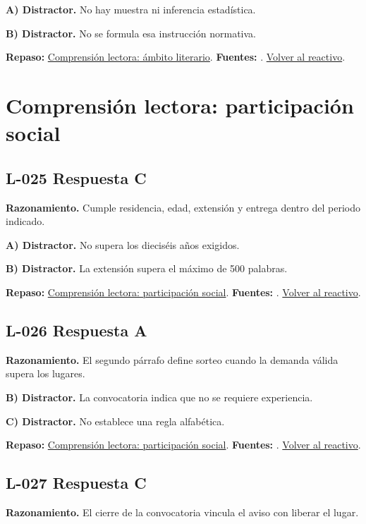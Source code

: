 \textbf{A) Distractor. }No hay muestra ni inferencia estadística.

\textbf{B) Distractor. }No se formula esa instrucción normativa.

\textbf{Repaso:} \hyperref[sec:l2]{Comprensión lectora: ámbito literario}. \textbf{Fuentes:} \cite{ceneval,reading}. \hyperref[q:L-024]{Volver al reactivo}.\par\medskip

\section{Comprensión lectora: participación social}

\subsection*{L-025 \quad Respuesta C}\label{s:L-025}
\textbf{Razonamiento.} Cumple residencia, edad, extensión y entrega dentro del periodo indicado.

\textbf{A) Distractor. }No supera los dieciséis años exigidos.

\textbf{B) Distractor. }La extensión supera el máximo de 500 palabras.

\textbf{Repaso:} \hyperref[sec:l3]{Comprensión lectora: participación social}. \textbf{Fuentes:} \cite{ceneval,reading}. \hyperref[q:L-025]{Volver al reactivo}.\par\medskip

\subsection*{L-026 \quad Respuesta A}\label{s:L-026}
\textbf{Razonamiento.} El segundo párrafo define sorteo cuando la demanda válida supera los lugares.

\textbf{B) Distractor. }La convocatoria indica que no se requiere experiencia.

\textbf{C) Distractor. }No establece una regla alfabética.

\textbf{Repaso:} \hyperref[sec:l3]{Comprensión lectora: participación social}. \textbf{Fuentes:} \cite{ceneval,reading}. \hyperref[q:L-026]{Volver al reactivo}.\par\medskip

\subsection*{L-027 \quad Respuesta C}\label{s:L-027}
\textbf{Razonamiento.} El cierre de la convocatoria vincula el aviso con liberar el lugar.

